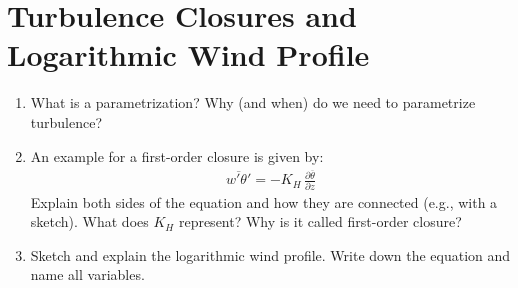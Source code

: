 \documentclass{article}
\begin{document}
\section{Turbulence Closures and Logarithmic Wind Profile}
\begin{enumerate}[label=(\alph*)]
    \item What is a parametrization? Why (and when) do we need to parametrize turbulence? %
    \item An example for a first-order closure is given by:
    \begin{align}
        \overline{w'\theta'} = - K_H \, \frac{\partial \overline{\theta}}{\partial z}
    \end{align}
    Explain both sides of the equation and how they are connected (e.g., with a sketch). What does $K_H$ represent? Why is it called first-order closure? %
    \item Sketch and explain the logarithmic wind profile. Write down the equation and name all variables. %
    
\end{enumerate}
\end{document}
